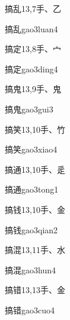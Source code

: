 \begin{entry}{搞乱}{13,7}{⼿、⼄}
  \begin{phonetics}{搞乱}{gao3luan4}
  \end{phonetics}
\end{entry}

\begin{entry}{搞定}{13,8}{⼿、⼧}
  \begin{phonetics}{搞定}{gao3ding4}
  \end{phonetics}
\end{entry}

\begin{entry}{搞鬼}{13,9}{⼿、⿁}
  \begin{phonetics}{搞鬼}{gao3gui3}
  \end{phonetics}
\end{entry}

\begin{entry}{搞笑}{13,10}{⼿、⽵}
  \begin{phonetics}{搞笑}{gao3xiao4}
  \end{phonetics}
\end{entry}

\begin{entry}{搞通}{13,10}{⼿、⾡}
  \begin{phonetics}{搞通}{gao3tong1}
  \end{phonetics}
\end{entry}

\begin{entry}{搞钱}{13,10}{⼿、⾦}
  \begin{phonetics}{搞钱}{gao3qian2}
  \end{phonetics}
\end{entry}

\begin{entry}{搞混}{13,11}{⼿、⽔}
  \begin{phonetics}{搞混}{gao3hun4}
  \end{phonetics}
\end{entry}

\begin{entry}{搞错}{13,13}{⼿、⾦}
  \begin{phonetics}{搞错}{gao3cuo4}
  \end{phonetics}
\end{entry}

